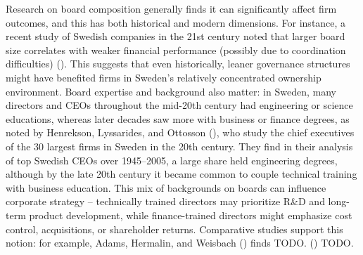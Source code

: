 \documentclass[
]{article}
\begin{document}
Research on board composition generally finds it can significantly
affect firm outcomes, and this has both historical and modern
dimensions. For instance, a recent study of Swedish companies in the
21st century noted that larger board size correlates with weaker
financial performance (possibly due to coordination
difficulties)\hspace{0pt}
().
This suggests that even historically, leaner governance structures might
have benefited firms in Sweden's relatively concentrated ownership
environment. Board expertise and background also matter: in Sweden, many
directors and CEOs throughout the mid-20th century had engineering or
science educations, whereas later decades saw more with business or
finance degrees, as noted by Henrekson, Lyssarides, and Ottosson
(), who study the
chief executives of the 30 largest firms in Sweden in the 20th century.
They find in their analysis of top Swedish CEOs over 1945--2005, a large
share held engineering degrees, although by the late 20th century it
became common to couple technical training with business
education\hspace{0pt}. This mix of backgrounds on boards can influence
corporate strategy -- technically trained directors may prioritize R\&D
and long-term product development, while finance-trained directors might
emphasize cost control, acquisitions, or shareholder returns.
Comparative studies support this notion: for example, Adams, Hermalin,
and Weisbach () finds
TODO. () TODO.
\end{document}
